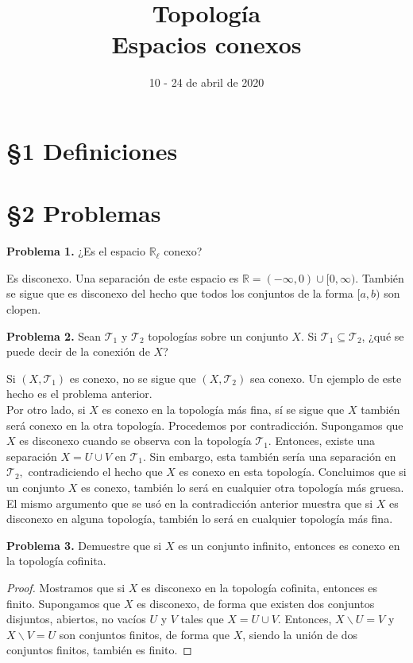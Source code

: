\documentclass{article}
\begin{document}
\date{10 - 24 de abril de 2020}
\title{ \textbf{Topología} \\
Espacios conexos}
\maketitle	


\section*{§1 Definiciones}


\section*{§2 Problemas}

\begin{mybox}
	\textbf{Problema 1. } ¿Es el espacio $\mathbb{R}_{\ell}$ conexo?
\end{mybox}	

 Es disconexo. Una separación de este espacio es $ \mathbb{R} = (-\infty, 0) \cup [0, \infty) .$ También se sigue que es disconexo del hecho que todos los conjuntos de la forma $[a, b)$ son clopen. 

\begin{mybox}
	\textbf{Problema 2. } Sean $\mathcal{T}_{1}$ y $\mathcal{T}_{2}$ topologías sobre un conjunto $X$. Si $\mathcal{T}_{1} \subseteq \mathcal{T}_{2}$, ¿qué se puede decir de la conexión de $X$?
\end{mybox}	

Si $(X, \mathcal{T}_{1})$ es conexo, no se sigue que $(X, \mathcal{T}_{2})$ sea conexo. Un ejemplo de este hecho es el problema anterior. \\
Por otro lado, si $X$ es conexo en la topología más fina, sí se sigue que $X$ también será conexo en la otra topología. 
Procedemos por contradicción. Supongamos que $X$ es disconexo cuando se observa con la topología $\mathcal{T}_{1}$. Entonces, existe una separación $X = U \cup V$ en $\mathcal{T}_{1}$. Sin embargo, esta también sería una separación en $\mathcal{T}_{2},$ contradiciendo el hecho que $X$ es conexo en esta topología. Concluimos que si un conjunto $X$ es conexo, también lo será en cualquier otra topología más gruesa. \\
El mismo argumento que se usó en la contradicción anterior muestra que si $X$ es disconexo en alguna topología, también lo será en cualquier topología más fina. 


\begin{mybox}
	\textbf{Problema 3. } Demuestre que si $X$ es un conjunto infinito, entonces es conexo en la topología cofinita. 
\end{mybox}	
\begin{proof}
	Mostramos que si $X$ es disconexo en la topología cofinita, entonces es finito. Supongamos que $X$ es disconexo, de forma que existen dos conjuntos disjuntos, abiertos, no vacíos $U$ y $V$ tales que $X = U \cup V$. Entonces, $X \backslash U = V$ y $X \backslash V = U$ son conjuntos finitos, de forma que $X$, siendo la unión de dos conjuntos finitos, también es finito.  
\end{proof}
\end{document}
